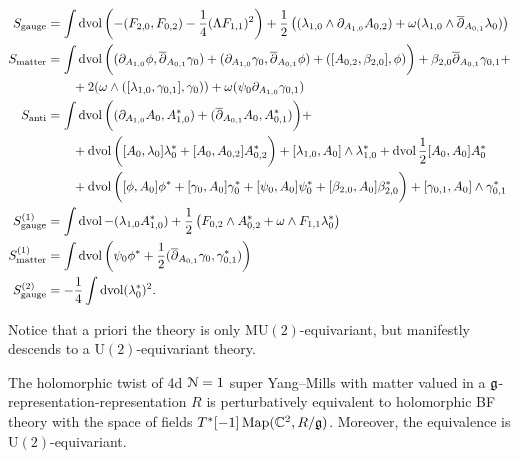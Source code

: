 \documentclass[10pt, oneside]{article}
\newcommand{\MU}{\mathrm{MU}}
\renewcommand{\U}{\mathrm{U}}
\begin{document}
\begin{align*}
S_{\mathrm{gauge}} &= \int\operatorname{dvol}\left(-(F_{2, 0}, F_{0, 2}) - \frac{1}{4}(\Lambda F_{1, 1})^2\right) + \frac 12 \left((\lambda_{1,0} \wedge \partial_{A_{1,0}} A_{0,2}) + \omega (\lambda_{1,0} \wedge \overline{\partial}_{A_{0,1}} \lambda_0) \right)  \\
S_{\mathrm{matter}} &= \int \operatorname{dvol} \bigg((\partial_{A_{1,0}}\phi , \overline{\partial}_{A_{0,1}} \gamma_0) + (\partial_{A_{1,0}}\gamma_0, \overline{\partial}_{A_{0,1}} \phi) + ([A_{0,2}, \beta_{2,0}], \phi) \bigg) + \beta_{2,0} \overline{\partial}_{A_{0,1}} \gamma_{0,1}  + \\
&\qquad + 2 (\omega \wedge ([\lambda_{1,0}, \gamma_{0,1}] ,\gamma_{0})  ) + \omega (\psi_0 \partial_{A_{1,0}} \gamma_{0,1}) \\
S_{\mathrm{anti}} &= \int \operatorname{dvol} \bigg((\partial_{A_{1, 0}} A_0, A_{1,0}^*) + (\overline{\partial}_{A_{0, 1}} A_0, A_{0,1}^*) \bigg) +  \\
& \qquad + \operatorname{dvol} \bigg([A_0, \lambda_0] \lambda_0^* + [A_0, A_{0,2}] A_{0,2}^* \bigg) + [\lambda_{1,0}, A_0] \wedge \lambda_{1,0}^* + \operatorname{dvol} \frac{1}{2}[A_0, A_0]A_0^*\\ 
&\qquad  + \operatorname{dvol} \bigg( [\phi, A_0] \phi^* + [\gamma_0, A_0] \gamma_0^*  + [\psi_0, A_0] \psi_0^* + [\beta_{2,0}, A_0] \beta_{2,0}^* \bigg) + [\gamma_{0,1}, A_0]\wedge \gamma_{0,1}^*\\
S^{(1)}_{\mathrm{gauge}} &=  \int  \operatorname{dvol} - (\lambda_{1,0} A_{1,0}^*)  + \frac 12  \left(F_{0,2}\wedge A_{0,2}^*+ \omega\wedge F_{1,1} \lambda_0^*  \right) \\
S^{(1)}_{\mathrm{matter}} &=  \int  \operatorname{dvol} \left( \psi_0 \phi^* + \frac 12 ( \overline{\partial}_{A_{0,1}} \gamma_{0} , \gamma_{0,1}^*) \right)\\
S^{(2)}_{\mathrm{gauge}} &= -\frac{1}{4}\int \operatorname{dvol}(\lambda_0^*)^2.
\end{align*}

Notice that a priori the theory is only $\MU(2)$-equivariant, but manifestly descends to a $\U(2)$-equivariant theory. 

\begin{theorem} \label{4d_minimal_twist_thm}
The holomorphic twist of 4d $\mathcal N=1$ super Yang--Mills with matter valued in a $\mathfrak g$-representation-representation $R$ is perturbatively equivalent to holomorphic BF theory with the space of fields $T^*[-1]\operatorname{Map}(\mathbb C^2, R/\mathfrak g)$. 
Moreover, the equivalence is $\U(2)$-equivariant.
\end{theorem}
\end{document}
